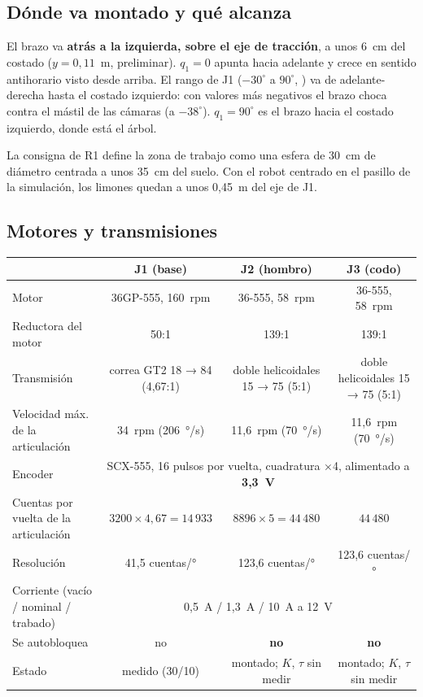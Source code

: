\subsection{Dónde va montado y qué alcanza}
El brazo va \textbf{atrás a la izquierda, sobre el eje de tracción}, a unos 6~cm del costado ($y = 0{,}11$~m,
preliminar). $q_1 = 0$ apunta hacia adelante y crece en sentido antihorario visto desde arriba. El rango de J1
($-30^\circ$ a $90^\circ$, ) va de adelante-derecha hasta el costado izquierdo: con valores más negativos
el brazo choca contra el mástil de las cámaras (a $-38^\circ$). $q_1 = 90^\circ$ es el brazo hacia el costado
izquierdo, donde está el árbol.

La consigna de R1 define la zona de trabajo como una esfera de 30~cm de diámetro centrada a unos 35~cm del suelo.
Con el robot centrado en el pasillo de la simulación, los limones quedan a unos 0,45~m del eje de J1.

\subsection{Motores y transmisiones}

\begin{center}
\begin{tabular}{@{}lccc@{}}
\toprule
 & \textbf{J1 (base)} & \textbf{J2 (hombro)} & \textbf{J3 (codo)} \\
\midrule
Motor & 36GP-555, 160~rpm & 36-555, 58~rpm & 36-555, 58~rpm \\
Reductora del motor & 50:1 & 139:1 & 139:1 \\
Transmisión & correa GT2 18 → 84 (4,67:1) & doble helicoidales 15 → 75 (5:1) & doble helicoidales 15 → 75 (5:1) \\
Velocidad máx. de la articulación & 34~rpm (206~°/s) & 11,6~rpm (70~°/s) & 11,6~rpm (70~°/s) \\
Encoder & \multicolumn{3}{c}{SCX-555, 16 pulsos por vuelta, cuadratura ×4, alimentado a \textbf{3,3~V}} \\
Cuentas por vuelta de la articulación & $3200 \times 4{,}67 = 14\,933$ & $8896 \times 5 = 44\,480$ & $44\,480$ \\
Resolución & 41,5 cuentas/° & 123,6 cuentas/° & 123,6 cuentas/° \\
Corriente (vacío / nominal / trabado) & \multicolumn{3}{c}{0,5~A / 1,3~A / 10~A a 12~V} \\
Se autobloquea & no & \textbf{no} & \textbf{no} \\
Estado & medido (30/10) & montado; $K$, $\tau$ sin medir & montado; $K$, $\tau$ sin medir \\
\bottomrule
\end{tabular}
\end{center}

